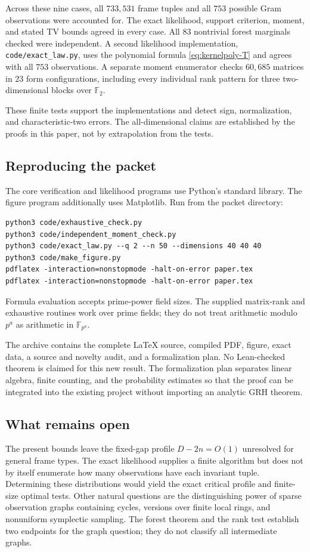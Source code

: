 \documentclass[11pt,letterpaper]{article}
\theoremstyle{definition}
\theoremstyle{remark}
\newcommand{\F}{\mathbb F}
\begin{document}
Across these nine cases, all $733{,}531$ frame tuples and all $753$ possible Gram observations were accounted for. The exact likelihood, support criterion, moment, and stated TV bounds agreed in every case. All $83$ nontrivial forest marginals checked were independent. A second likelihood implementation, \texttt{code/exact\_law.py}, uses the polynomial formula \eqref{eq:kernelpoly-T} and agrees with all $753$ observations. A separate moment enumerator checks $60{,}685$ matrices in $23$ form configurations, including every individual rank pattern for three two-dimensional blocks over $\F_2$.

These finite tests support the implementations and detect sign, normalization, and characteristic-two errors. The all-dimensional claims are established by the proofs in this paper, not by extrapolation from the tests.

\subsection{Reproducing the packet}

The core verification and likelihood programs use Python's standard library. The figure program additionally uses Matplotlib. Run from the packet directory:
\begin{verbatim}
python3 code/exhaustive_check.py
python3 code/independent_moment_check.py
python3 code/exact_law.py --q 2 --n 50 --dimensions 40 40 40
python3 code/make_figure.py
pdflatex -interaction=nonstopmode -halt-on-error paper.tex
pdflatex -interaction=nonstopmode -halt-on-error paper.tex
\end{verbatim}
Formula evaluation accepts prime-power field sizes. The supplied matrix-rank and exhaustive routines work over prime fields; they do not treat arithmetic modulo $p^a$ as arithmetic in $\F_{p^a}$.

The archive contains the complete LaTeX source, compiled PDF, figure, exact data, a source and novelty audit, and a formalization plan. No Lean-checked theorem is claimed for this new result. The formalization plan separates linear algebra, finite counting, and the probability estimates so that the proof can be integrated into the existing project without importing an analytic GRH theorem.

\subsection{What remains open}

The present bounds leave the fixed-gap profile $D-2n=O(1)$ unresolved for general frame types. The exact likelihood supplies a finite algorithm but does not by itself enumerate how many observations have each invariant tuple. Determining these distributions would yield the exact critical profile and finite-size optimal tests. Other natural questions are the distinguishing power of sparse observation graphs containing cycles, versions over finite local rings, and nonuniform symplectic sampling. The forest theorem and the rank test establish two endpoints for the graph question; they do not classify all intermediate graphs.
\end{document}
